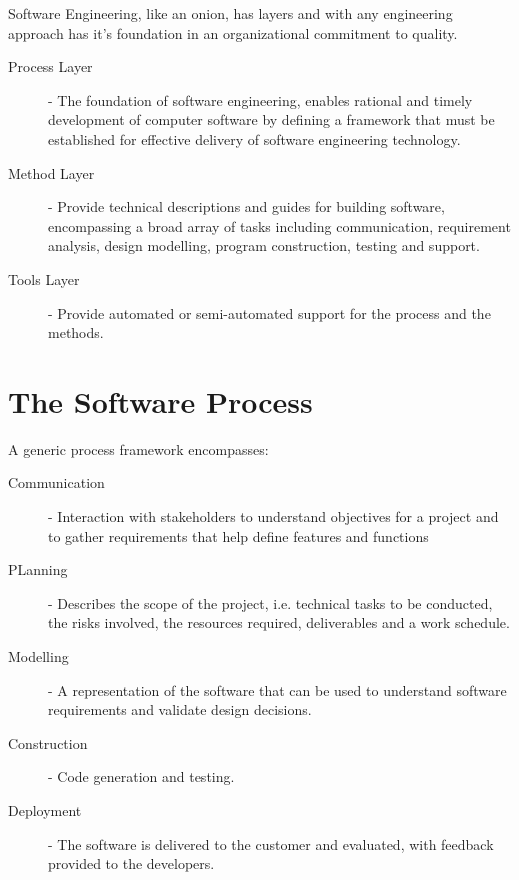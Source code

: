 \documentclass[12pt letter]{report}
\begin{document}
Software Engineering, like an onion, has layers and with any engineering approach has it's foundation in an
organizational commitment to quality.
\begin{description}
  \item[Process Layer]  - The foundation of software engineering, enables rational and timely development of computer
        software by defining a framework that must be established for effective delivery of software engineering
        technology.
  \item[Method Layer] - Provide technical descriptions and guides for building software, encompassing a broad array of
        tasks including communication, requirement analysis, design modelling, program construction, testing and support.
  \item[Tools Layer] - Provide automated or semi-automated support for the process and the methods.
\end{description}

\section{The Software Process}


A generic process framework encompasses:
\begin{description}
  \item[Communication] - Interaction with stakeholders to understand objectives for a project and to gather requirements that help define features and functions
  \item[PLanning] - Describes the scope of the project, i.e. technical tasks to be conducted, the risks involved, the resources required, deliverables and a work schedule.
  \item[Modelling] - A representation of the software that can be used to understand software requirements and validate design decisions.
  \item[Construction] - Code generation and testing.
  \item[Deployment] - The software is delivered to the customer and evaluated, with feedback provided to the developers.
\end{description}
\end{document}
